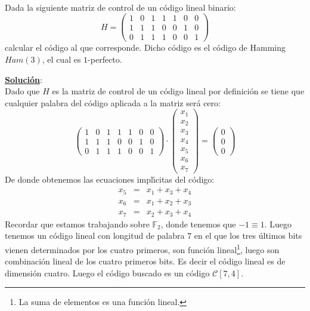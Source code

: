 \begin{ejercicio}
\ \\
Dada la siguiente matriz de control de un c\'odigo lineal binario:
\begin{displaymath}
H=\left( \begin{array}{ccccccc}
1&0&1&1&1&0&0\\
1&1&1&0&0&1&0\\
0&1&1&1&0&0&1
\end{array} \right)
\end{displaymath}
calcular el c\'odigo al que corresponde. Dicho c\'odigo es el c\'odigo de
Hamming $Ham(3)$, el cual es $1$-perfecto.
\end{ejercicio}
\underline{\textbf{Soluci\'on}}:\\
Dado que $H$ es la matriz de control de un c\'odigo lineal por definici\'on
se tiene que cualquier palabra del c\'odigo aplicada a la matriz ser\'a cero:
\begin{displaymath}
\left( \begin{array}{ccccccc}
1&0&1&1&1&0&0\\
1&1&1&0&0&1&0\\
0&1&1&1&0&0&1
\end{array} \right)\cdot
\left( \begin{array}{c}
x_1\\
x_2\\
x_3\\
x_4\\
x_5\\
x_6\\
x_7
\end{array} \right)=
\left( \begin{array}{c}
0\\
0\\
0
\end{array} \right)
\end{displaymath}
De donde obtenemos las ecuaciones impl\'{\i}citas del c\'odigo:
\begin{eqnarray*}
x_5&=&x_1+x_3+x_4\\
x_6&=&x_1+x_2+x_3\\
x_7&=&x_2+x_3+x_4
\end{eqnarray*}
Recordar que estamos trabajando sobre $\mathbb{F}_2$, donde tenemos que
$-1 \equiv 1$.     
%
\newpage
%
Luego tenemos un c\'odigo lineal con longitud de palabra $7$ en el que los
tres \'ultimos bits vienen determinados por los cuatro primeros, son funci\'on
lineal\footnote{La suma de elementos es una funci\'on lineal.}, luego son
combinaci\'on lineal de los cuatro primeros bits. Es decir el c\'odigo lineal
es de dimensi\'on cuatro. Luego el c\'odigo buscado es un c\'odigo
$\mathcal{C}[7,4]$.\\

